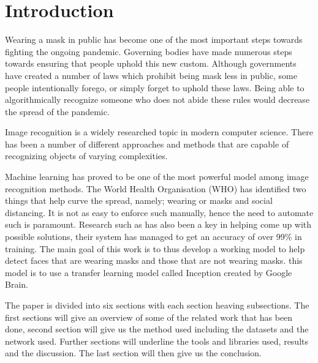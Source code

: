 \chapter*{Introduction}

Wearing a mask in public has become one of the most important steps towards fighting the ongoing pandemic.
Governing bodies have made numerous steps towards ensuring that people uphold this new custom.
Although governments have created a number of laws which prohibit being mask less in public, some people intentionally forego, or simply forget to uphold these laws.
Being able to algorithmically recognize someone who does not abide these rules would decrease the spread of the pandemic.

Image recognition is a widely researched topic in modern computer science. 
There has been a number of different approaches and methods that are capable of recognizing objects of varying complexities.

Machine learning has proved to be one of the most powerful model among image recognition methods. The World Health Organisation (WHO) has identified two things that help curve the spread, namely; wearing or masks and social distancing. It is not as easy to enforce such manually, hence the need to automate such is paramount. Research such as \cite{chowdary2020face} has also been a key in helping come up with possible solutions, their system has managed to get an accuracy of over 99\% in training. The main goal of this work is to thus develop a working model to help detect faces that are wearing masks and those that are not wearing masks. this model is to use a transfer learning model called Inception created by Google Brain. 

The paper is divided into six sections with each section heaving subsections. The first sections will give an overview of some of the related work that has been done, second section will give us the method used including the datasets and the network used. Further sections will underline the tools and libraries used, results and the discussion. The last section will then give us the conclusion.



